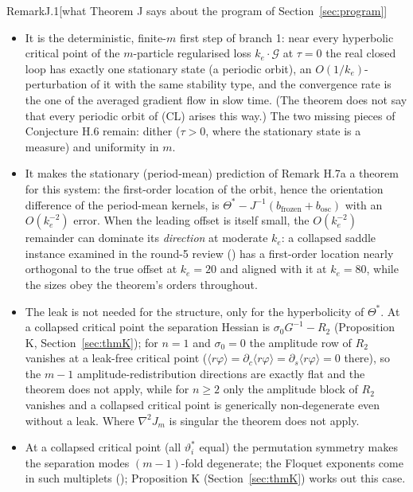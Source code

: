 \begin{rmk}{Remark}{J.1}[what Theorem J says about the program of Section~\ref{sec:program}]
\leavevmode
\begin{itemize}
  \item It is the deterministic, finite-$m$ first step of branch 1: near every hyperbolic critical point of the
    $m$-particle regularised loss $k_e\cdot\mathcal G$ at $\tau = 0$ the real closed loop has exactly one stationary
    state (a periodic orbit), an $O(1/k_e)$-perturbation of it with the same stability type, and the convergence rate
    is the one of the averaged gradient flow in slow time. (The theorem does not say that every periodic orbit of
    (CL) arises this way.) The two missing pieces of Conjecture H.6 remain: dither ($\tau>0$, where the stationary
    state is a measure) and uniformity in $m$.
  \item It makes the stationary (period-mean) prediction of Remark H.7a a theorem for this system: the first-order
    location of the orbit, hence the orientation difference of the period-mean kernels, is
    $\Theta^* - J^{-1}(b_{\mathrm{frozen}} + b_{\mathrm{osc}})$ with an $O(k_e^{-2})$ error. When the leading offset
    is itself small, the $O(k_e^{-2})$ remainder can dominate its \emph{direction} at moderate $k_e$: a collapsed
    saddle instance examined in the round-5 review () has a first-order location
    nearly orthogonal to the true offset at $k_e = 20$ and aligned with it at $k_e = 80$, while the sizes obey the
    theorem's orders throughout.
  \item The leak is not needed for the structure, only for the hyperbolicity of $\Theta^*$. At a collapsed critical
    point the separation Hessian is $\sigma_0G^{-1} - R_2$ (Proposition K, Section~\ref{sec:thmK}); for $n = 1$ and
    $\sigma_0 = 0$ the amplitude row of $R_2$ vanishes at a leak-free critical point
    ($\langle r\varphi\rangle = \partial_c\langle r\varphi\rangle = \partial_s\langle r\varphi\rangle = 0$ there), so
    the $m-1$ amplitude-redistribution directions are exactly flat and the theorem does not apply, while for $n\ge2$
    only the amplitude block of $R_2$ vanishes and a collapsed critical point is generically non-degenerate even
    without a leak. Where $\nabla^2J_m$ is singular the theorem does not apply.
  \item At a collapsed critical point (all $\vartheta^*_i$ equal) the permutation symmetry makes the separation modes
    $(m-1)$-fold degenerate; the Floquet exponents come in such multiplets ();
    Proposition K (Section~\ref{sec:thmK}) works out this case.
\end{itemize}
\end{rmk}
